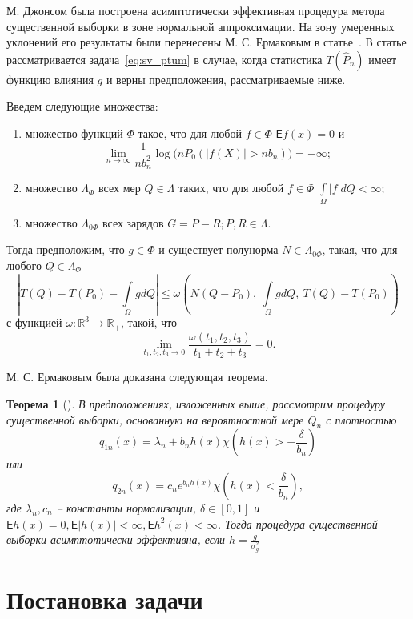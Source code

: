 \documentclass[12pt, specialist, subf, substylefile = spbu.rtx]{disser}
\newtheorem{theorem}{Теорема}
\newcommand{\Expect}{\mathsf{E}}
\begin{document}
М. Джонсом была построена асимптотически эффективная процедура метода существенной выборки в зоне нормальной аппроксимации. На зону умеренных уклонений его результаты были перенесены М. С. Ермаковым в статье~\cite{Ermakov}. В статье рассматривается задача~\eqref{eq:sv_ptum} в случае, когда статистика $T(\hat{P}_n)$ имеет функцию влияния $g$ и верны предположения, рассматриваемые ниже.

Введем следующие множества: 
\begin{enumerate}
\item множество функций $\Phi$ такое, что для любой $f \in \Phi$  $\Expect f(x)=0 $ и
$$
\lim\limits_{n \to \infty} \frac{1}{nb_n^2} \log \big(nP_0(|f(X)|>nb_n)\big)=-\infty;
$$

\item множество $\Lambda_\Phi$ всех мер $Q \in \Lambda$ таких, что для любой $f \in \Phi$
$
\int\limits_{\Omega} |f| dQ < \infty;
$

\item множество $\Lambda_{0\Phi}$ всех зарядов $G=P-R; P, R \in \Lambda$.

\end{enumerate}

Тогда предположим, что $g \in \Phi$ и существует полунорма $N \in \Lambda_{0\Phi}$, такая, что для любого $Q \in \Lambda_\Phi$
$$
|T(Q)-T(P_0)-\int\limits_{\Omega}g dQ| \le 
\omega\left(N(Q-P_0),\ \int\limits_{\Omega}g dQ,\ T(Q)-T(P_0) \right)
$$
с функцией $\omega\colon \mathbb{R}^3 \to \mathbb{R}_+$, такой, что
$$
\lim\limits_{t_1, t_2, t_3 \to 0} \frac{\omega(t_1, t_2, t_3)}{t_1+ t_2+t_3} = 0.
$$

М. С. Ермаковым была доказана следующая теорема.
\begin{theorem}[{\cite{Ermakov}}]\label{th:erm}
В предположениях, изложенных выше, рассмотрим процедуру существенной выборки, основанную на вероятностной мере $Q_n$ с плотностью 
$$
q_{1n}(x)=\lambda_n+b_nh(x)\chi\left(h(x)>-\frac{\delta}{b_n}\right)
$$
или
$$
q_{2n}(x)=c_ne^{b_nh(x)} \chi\left(h(x)<\frac{\delta}{b_n}\right),
$$
где $\lambda_n, c_n$ -- константы нормализации, $\delta \in [0, 1]$ и $\Expect h(x)=0, \Expect|h(x)|<\infty, \Expect h^2(x)< \infty$. Тогда процедура существенной выборки асимптотически эффективна, если $h=\frac{g}{\sigma^2_g}$

\end{theorem}


\section{Постановка задачи}
\end{document}
